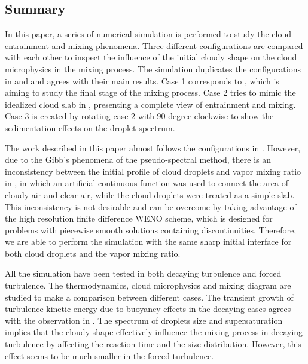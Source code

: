 \subsection{Summary}
In this paper, a series of numerical simulation is performed to study the cloud
entrainment and mixing phenomena. Three different configurations are compared
with each other to inspect the influence of the initial cloudy shape on the
cloud microphysics in the mixing process. The simulation duplicates the
configurations in \cite{And04} and \cite{Kumar11} and agrees with their main
results. Case 1 corresponds to \cite{And04}, which is aiming to study the final
stage of the mixing process. Case 2 tries to mimic the idealized cloud slab in
\cite{Kumar11}, presenting a complete view of entrainment and mixing. Case 3 is
created by rotating case 2 with $90$ degree clockwise to show the sedimentation
effects on the droplet spectrum.

The work described in this paper almost follows the configurations in
\cite{Kumar11}. However, due to the Gibb's phenomena of the pseudo-spectral
method, there is an inconsistency between the initial profile of cloud droplets
and vapor mixing ratio in \cite{Kumar11}, in which an artificial continuous
function was used to connect the area of cloudy air and clear air, while the
cloud droplets were treated as a simple slab. This inconsistency is not
desirable and can be overcome by taking advantage of the high resolution finite
difference WENO scheme, which is designed for problems with piecewise smooth
solutions containing discontinuities. Therefore, we are able to perform the
simulation with the same sharp initial interface for both cloud droplets and
the vapor mixing ratio.

All the simulation have been tested in both decaying turbulence and forced
turbulence. The thermodynamics, cloud microphysics and mixing diagram are
studied to make a comparison between different cases. The transient growth of
turbulence kinetic energy due to buoyancy effects in the decaying cases agrees
with the observation in \cite{Kumar14}. The spectrum of droplets size and
supersaturation implies that the cloudy shape effectively influence the mixing
process in decaying turbulence by affecting the reaction time and the size
distribution. However, this effect seems to be much smaller in the forced
turbulence.

